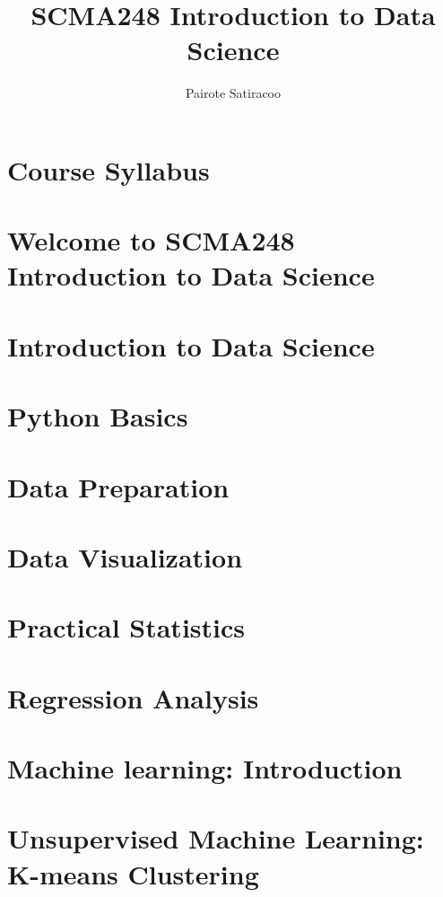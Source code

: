 \documentclass{article}
\begin{document}
\title{SCMA248 Introduction to Data Science}
\author{Pairote Satiracoo}
\maketitle


\tableofcontents 
\newpage

\section{Course Syllabus}


\section{Welcome to SCMA248 Introduction to Data Science}

\section{Introduction to Data Science}

\section{Python Basics}

\section{Data Preparation}

\section{Data Visualization}

\section{Practical Statistics}

\section{Regression Analysis}

\section{Machine learning: Introduction}

\section{Unsupervised Machine Learning: K-means Clustering}

\end{document}
